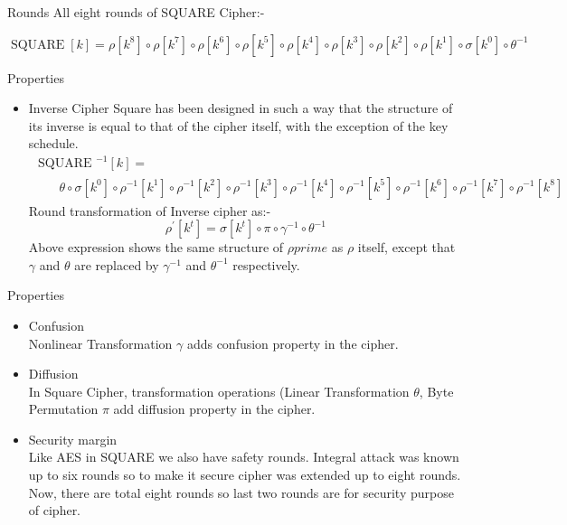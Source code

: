 \begin{frame}{Rounds}
    All eight rounds of SQUARE Cipher:-
    \begin{beamerboxesrounded}
        $$
        \operatorname{SQUARE}[k]=\rho\left[k^{8}\right] \circ \rho\left[k^{7}\right] \circ \rho\left[k^{6}\right] \circ \rho\left[k^{5}\right] \circ \rho\left[k^{4}\right] \circ \rho\left[k^{3}\right] \circ \rho\left[k^{2}\right] \circ \rho\left[k^{1}\right] \circ \sigma\left[k^{0}\right] \circ \theta^{-1}
        $$
    \end{beamerboxesrounded}
\end{frame}

\begin{frame}{Properties}
    \begin{itemize}
        \item {Inverse Cipher}
            Square has been designed in such a way that the structure of its inverse is equal to that of the cipher itself, with the exception of the key schedule.
            $$
            \begin{array}{l}
            \text { SQUARE }^{-1}[k]= \\
            \qquad  \theta \circ \sigma\left[k^{0}\right] \circ \rho^{-1}\left[k^{1}\right] \circ \rho^{-1}\left[k^{2}\right] \circ \rho^{-1}\left[k^{3}\right] \circ              \rho^{-1}\left[k^{4}\right] \circ \rho^{-1}\left[k^{5}\right] \circ \rho^{-1}\left[k^{6}\right] \circ \rho^{-1}\left[k^{7}\right] \circ \rho^{-1}\left[k^{8}\right]
            \end{array}
            $$
            Round transformation  of Inverse cipher as:-
            $$
            \rho^{\prime}\left[k^{t}\right]=\sigma\left[k^{t}\right] \circ \pi \circ \gamma^{-1} \circ \theta^{-1}
            $$
            Above expression shows the same structure of $\rho{prime}$ as $\rho$ itself, except that $\gamma$ and $\theta$ are replaced by $\gamma^{-1}$ and $\theta^{-1}$    respectively.
    \end{itemize}
\end{frame}

\begin{frame}{Properties}
\begin{itemize}
    \item {Confusion\\}
         Nonlinear Transformation $\gamma$ adds confusion property in the cipher.
    \item{Diffusion\\}
         In Square Cipher, transformation operations (Linear Transformation $\theta$, Byte Permutation $\pi$ add diffusion property in the cipher.
    \item{Security margin\\}
         Like AES in SQUARE we also have safety rounds. Integral attack was known up to six rounds so to make it secure cipher was extended up to eight rounds. Now, there are total eight rounds so last two rounds are for security purpose of cipher.
\end{itemize}
\end{frame}
% 
